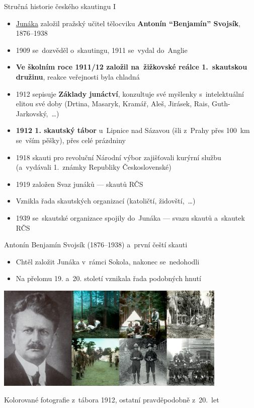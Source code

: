 \documentclass[compress, ucs, xelatex, 11pt, xcolor=dvipsnames, print, aspectratio=169,
	hyperref={
		bookmarks=true,
		unicode=true,
		colorlinks=true,
		pdftitle={Skautska vychovna metoda},
		plainpages=false,
		pdfauthor={Vojtech Zeisek},
		pdfsubject={Skautska vychovna metoda a jeji vyvoj za posledni stoleti a desetileti},
		pdfcreator={XeLaTeX},
		pdfkeywords={Junak, Pedagogika, Skaut, Skauting, Vychovna metoda},
		linkcolor=Red, %
		anchorcolor=ForestGreen, %
		citecolor=ForestGreen, %
		filecolor=ForestGreen, %
		menucolor=ForestGreen, %
		urlcolor=Sepia, %
		pdftex},
	url={hyphens, lowtilde} %
	]{beamer}
\begin{document}
\begin{frame}{Stručná historie českého skautingu I}
	\begin{itemize}
		\item \href{https://www.skaut.cz/skauting/historie/}{Junáka} založil pražský učitel tělocviku \textbf{Antonín \enquote{Benjamín} Svojsík}, 1876--1938
		\item 1909 se~dozvěděl o~skautingu, 1911 se~vydal do~Anglie
		\item \textbf{Ve školním roce 1911/12 založil na~žižkovské reálce 1.~skautskou družinu}, reakce veřejnosti byla chladná
		\item 1912 sepisuje \textbf{Základy junáctví}, konzultuje své myšlenky s~intelektuální elitou své doby (Drtina, Masaryk, Kramář, Aleš, Jirásek, Rais, Guth-Jarkovský,~\ldots)
		\item \textbf{1912 1. skautský tábor} u~Lipnice nad Sázavou (šli z~Prahy přes 100~km se~vším pěšky), přes celé prázdniny
		\item 1918 skauti pro revoluční Národní výbor zajišťovali kurýrní službu (a~vydávali 1.~známky Republiky Československé)
		\item 1919 založen Svaz junáků --- skautů RČS
		\item Vznikla řada skautských organizací (katoličtí, židovští,~\ldots)
		\item 1939 se~skautské organizace spojily do~Junáka --- svazu skautů a~skautek RČS
	\end{itemize}
\end{frame}

\begin{frame}{Antonín Benjamín Svojsík (1876--1938) a~první čeští skauti}
	\begin{itemize}
		\item Chtěl založit Junáka v~rámci Sokola, nakonec se~nedohodli
		\item Na přelomu 19. a~20. století vznikala řada podobných hnutí
	\end{itemize}
	\begin{center}
		\includegraphics[height=5cm]{svojsik_prvni_skauti.jpg}
	\end{center}
	\begin{flushright}
		Kolorované fotografie z~tábora 1912, ostatní pravděpodobně z~20.~let
	\end{flushright}
\end{frame}
\end{document}

